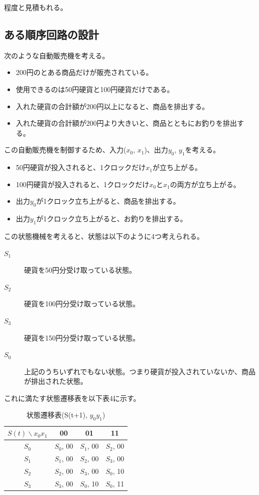 \documentclass[10pt,a4j,dvipdfmx]{jsarticle}
\makeatletter
\let\@oldsubsec\subsection
\renewcommand{\subsection}[1]{\vspace{-7pt}\@oldsubsec{#1}}
\makeatother
\begin{document}
程度と見積もれる。

\subsection{ある順序回路の設計}
次のような自動販売機を考える。
\begin{itemize}
\item 200円のとある商品だけが販売されている。
\item 使用できるのは50円硬貨と100円硬貨だけである。
\item 入れた硬貨の合計額が200円以上になると、商品を排出する。
\item 入れた硬貨の合計額が200円より大きいと、商品とともにお釣りを排出する。
\end{itemize}

この自動販売機を制御するため、入力($x_0$, $x_1$)、出力$y_0$, $y_1$を考える。

\begin{itemize}
\item 50円硬貨が投入されると、1クロックだけ$x_1$が立ち上がる。
\item 100円硬貨が投入されると、1クロックだけ$x_0$と$x_1$の両方が立ち上がる。
\item 出力$y_0$が1クロック立ち上がると、商品を排出する。
\item 出力$y_1$が1クロック立ち上がると、お釣りを排出する。
\end{itemize}

この状態機械を考えると、状態は以下のように4つ考えられる。

\begin{description}
\item[$S_1$] 硬貨を50円分受け取っている状態。
\item[$S_2$] 硬貨を100円分受け取っている状態。
\item[$S_3$] 硬貨を150円分受け取っている状態。
\item[$S_0$] 上記のうちいずれでもない状態。つまり硬貨が投入されていないか、商品が排出された状態。
\end{description}

これに満たす状態遷移表を以下表4に示す。

\begin{table}[H]
    \centering
    \caption{状態遷移表(S(t+1), $y_0y_1$)}
    \begin{tabular}{|c||c|c|c|} \hline
      $S(t) \backslash x_0x_1$ & 00 & 01 & 11 \\ \hline \hline
      $S_0$ & $S_0$, 00 & $S_1$, 00 & $S_2$, 00 \\
      $S_1$ & $S_1$, 00 & $S_2$, 00 & $S_3$, 00 \\
      $S_2$ & $S_2$, 00 & $S_3$, 00 & $S_0$, 10 \\
      $S_3$ & $S_3$, 00 & $S_0$, 10 & $S_0$, 11 \\
      \hline
    \end{tabular}
\end{table}
\end{document}
